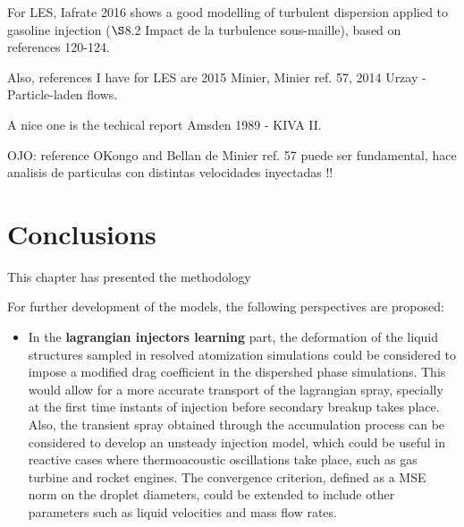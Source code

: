 For LES, Iafrate 2016 shows a good modelling of turbulent dispersion applied to gasoline injection ($\S$8.2 Impact de la turbulence sous-maille), based on references 120-124.

Also, references I have for LES are 2015 Minier, Minier ref. 57, 2014 Urzay - Particle-laden flows.

A nice one is the techical report Amsden 1989 - KIVA II.

OJO: reference OKongo and Bellan de Minier ref. 57 puede ser fundamental, hace analisis de particulas con distintas velocidades inyectadas !!


\section{Conclusions}

This chapter has presented the methodology 


For further development of the models, the following perspectives are proposed:

\begin{itemize}

	\item In the \textbf{lagrangian injectors learning} part, the deformation of the liquid structures sampled in resolved atomization simulations could be considered to impose a modified drag coefficient in the dispershed phase simulations. This would allow for a more accurate transport of the lagrangian spray, specially at the first time instants of injection before secondary breakup takes place. Also, the transient spray obtained through the accumulation process can be considered to develop an unsteady injection model, which could be useful in reactive cases where thermoacoustic oscillations take place, such as gas turbine and rocket engines. The convergence criterion, defined as a MSE norm on the droplet diameters, could be extended to include other parameters such as liquid velocities and mass flow rates.

\end{itemize}